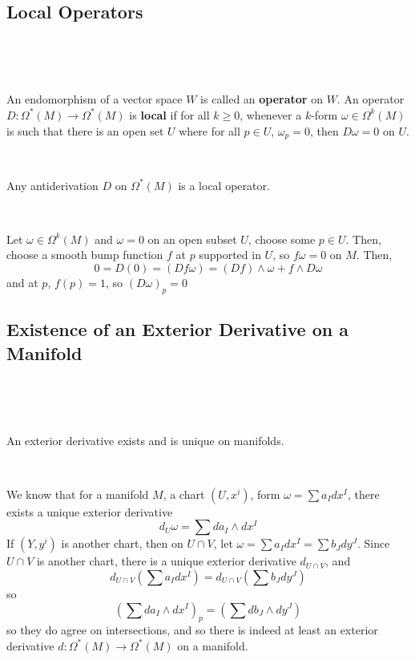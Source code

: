 \documentclass{article}
\begin{document}
\subsection{Local Operators}
\

\begin{definition}[Operators]
  \

  An endomorphism of a vector space $W$ is called an \textbf{operator} on $W$. An operator $D: \Omega^*(M) \to \Omega^*(M)$ is \textbf{local} if for all $k \geq 0$, whenever a $k$-form $\omega \in \Omega^k(M)$ is such that there is an open set $U$ where for all $p \in U$, $\omega_p = 0$, then $D\omega = 0$ on $U$.
\end{definition}

\begin{proposition}
  \

  Any antiderivation $D$ on $\Omega^*(M)$ is a local operator.
\end{proposition}

\begin{customproof}
  \

  Let $\omega \in \Omega^k(M)$ and $\omega = 0$ on an open subset $U$, choose some $p\in U$. Then, choose a smooth bump function $f$ at $p$ supported in $U$, so $f\omega = 0$ on $M$. Then, $$0 = D(0) = (Df\omega) = (Df) \wedge \omega + f\wedge D\omega$$and at $p$, $f(p) = 1$, so $(D\omega)_p = 0$
\end{customproof}

\subsection{Existence of an Exterior Derivative on a Manifold}
\

\begin{proposition}
  \

  An exterior derivative exists and is unique on manifolds.
\end{proposition}

\begin{customproof}
  \

  We know that for a manifold $M$, a chart $(U,x^i)$, form $\omega = \sum a_Idx^I$, there exists a unique exterior derivative $$d_U\omega = \sum da_I \wedge dx^I$$If $(Y, y^i)$ is another chart, then on $U \cap V$, let $\omega = \sum a_Idx^I = \sum b_Jdy^J$. Since $U \cap V$ is another chart, there is a unique exterior derivative $d_{U \cap V}$, and $$d_{U \cap V}(\sum a_I dx^I) = d_{U \cap V}(\sum b_J dy^J)$$so $$(\sum da_I\wedge dx^I)_p = (\sum db_J \wedge dy^J)$$so they do agree on intersections, and so there is indeed at least an exterior derivative $d: \Omega^*(M) \to \Omega^*(M)$ on a manifold.
\end{customproof}
\end{document}

